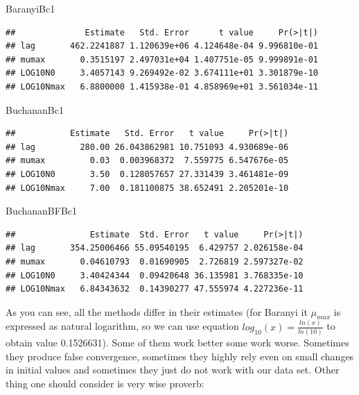 \documentclass[]{book}
\newenvironment{Shaded}{\begin{snugshade}}{\end{snugshade}}
\newcommand{\NormalTok}[1]{#1}
\theoremstyle{definition}
\theoremstyle{definition}
\theoremstyle{definition}
\theoremstyle{remark}
\begin{document}
\begin{Shaded}
\begin{Highlighting}[]
\NormalTok{BaranyiBc1}
\end{Highlighting}
\end{Shaded}

\begin{verbatim}
##              Estimate   Std. Error      t value     Pr(>|t|)
## lag       462.2241887 1.120639e+06 4.124648e-04 9.996810e-01
## mumax       0.3515197 2.497031e+04 1.407751e-05 9.999891e-01
## LOG10N0     3.4057143 9.269492e-02 3.674111e+01 3.301879e-10
## LOG10Nmax   6.8800000 1.415938e-01 4.858969e+01 3.561034e-11
\end{verbatim}

\begin{Shaded}
\begin{Highlighting}[]
\NormalTok{BuchananBc1}
\end{Highlighting}
\end{Shaded}

\begin{verbatim}
##           Estimate   Std. Error   t value     Pr(>|t|)
## lag         280.00 26.043862981 10.751093 4.930689e-06
## mumax         0.03  0.003968372  7.559775 6.547676e-05
## LOG10N0       3.50  0.128057657 27.331439 3.461481e-09
## LOG10Nmax     7.00  0.181100875 38.652491 2.205201e-10
\end{verbatim}

\begin{Shaded}
\begin{Highlighting}[]
\NormalTok{BuchananBFBc1}
\end{Highlighting}
\end{Shaded}

\begin{verbatim}
##               Estimate  Std. Error   t value     Pr(>|t|)
## lag       354.25006466 55.09540195  6.429757 2.026158e-04
## mumax       0.04610793  0.01690905  2.726819 2.597327e-02
## LOG10N0     3.40424344  0.09420648 36.135981 3.768335e-10
## LOG10Nmax   6.84343632  0.14390277 47.555974 4.227236e-11
\end{verbatim}

As you can see, all the methods differ in their estimates (for Baranyi
it \(\mu_{max}\) is expressed as natural logarithm, so we can use
equation \(log_{10}(x) = \frac{ln(x)}{ln(10)}\) to obtain value
0.1526631). Some of them work better some work worse. Sometimes they
produce false convergence, sometimes they highly rely even on small
changes in initial values and sometimes they just do not work with our
data set. Other thing one should consider is very wise proverb:
\end{document}
